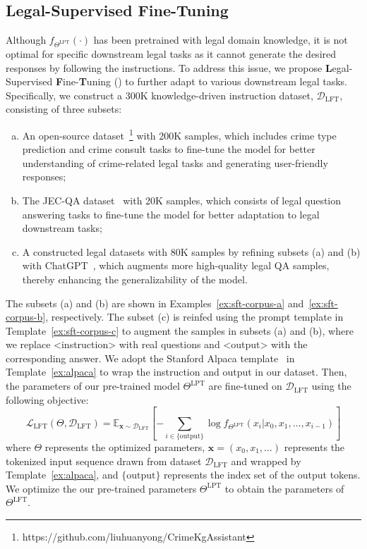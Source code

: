 \subsection{Legal-Supervised Fine-Tuning}

Although $f_{\Theta^{\text{LPT}}}(\cdot)$ has been pretrained with legal domain knowledge, it is not optimal for specific downstream legal tasks as it cannot generate the desired responses by following the instructions. 
To address this issue, we propose \textbf{L}egal-{S}upervised \textbf{F}ine-\textbf{T}uning () to further adapt \algo to various downstream legal tasks. 
Specifically, we construct a 300K knowledge-driven instruction dataset, $\mathcal{D}_{\text{LFT}}$, consisting of three subsets: 
\begin{enumerate}[(a)]
    \item An open-source dataset~\footnote{https://github.com/liuhuanyong/CrimeKgAssistant} with 200K samples, which includes crime type prediction and crime consult tasks to fine-tune the model for better understanding of crime-related legal tasks and generating user-friendly responses; 
    \item The JEC-QA dataset~\citep{zhong20jecqa} with 20K samples, which consists of legal question answering tasks to fine-tune the model for better adaptation to legal downstream tasks;
    \item A constructed legal datasets with 80K samples by refining subsets (a) and (b) with ChatGPT~\citep{GPT35T}, which augments more high-quality legal QA samples, thereby enhancing the generalizability of the model.
\end{enumerate}
The subsets (a) and (b) are shown in Examples~\ref{ex:sft-corpus-a} and~\ref{ex:sft-corpus-b}, respectively.  The subset (c) is reinfed using the prompt template in Template~\ref{ex:sft-corpus-c} to augment the samples in subsets (a) and (b), where we replace <instruction> with real questions and <output> with the corresponding answer. 
We adopt the Stanford Alpaca template~\citep{taori23alpaca} in Template~\ref{ex:alpaca} to wrap the instruction and output in our dataset.
Then, the parameters of our pre-trained model $\Theta^{\text{LPT}}$ are fine-tuned on $\mathcal{D}_{\text{LFT}}$ using the following objective:
\begin{equation}
    \mathcal{L}_{\text{LFT}}(\Theta, \mathcal{D}_{\text{LFT}}) = \mathbb{E}_{\boldsymbol{x} \sim \mathcal{D}_{\text{LFT}}}\left[ -\sum\limits_{i\in\{\text{output}\}} \log{f_{\Theta^{\text{LPT}}}(x_i | x_0, x_1, \ldots, x_{i-1})} \right]
\end{equation}
where $\Theta$ represents the optimized parameters, $\boldsymbol{x} = (x_0, x_1, \ldots)$ represents the tokenized input sequence drawn from dataset $\mathcal{D}_{\text{LFT}}$ and wrapped by Template~\ref{ex:alpaca}, and $\{\text{output}\}$ represents the index set of the output tokens. 
We optimize the our pre-trained parameters $\Theta^{\text{LPT}}$ to obtain the parameters of \algo $\Theta^{\text{LFT}}$.

